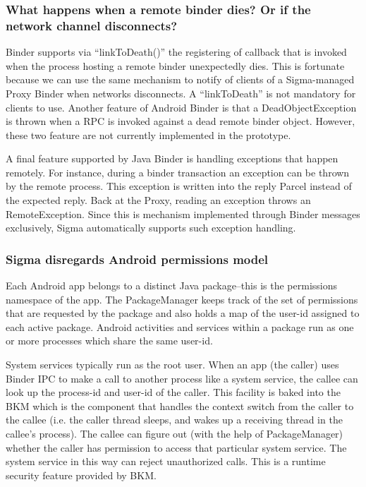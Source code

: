 \documentclass[prodmode]{acmlarge}
\begin{document}
\subsubsection{What happens when a remote binder dies? Or if the network channel disconnects?}
Binder supports via ``linkToDeath()'' the registering of callback that is invoked when the process hosting a remote binder unexpectedly dies. This is fortunate because we can use the same mechanism to notify of clients of a Sigma-managed Proxy Binder when networks disconnects. A ``linkToDeath'' is not mandatory for clients to use. Another feature of Android Binder is that a DeadObjectException is thrown when a RPC is invoked against a dead remote binder object. However, these two feature are not currently implemented in the prototype.

A final feature supported by Java Binder is handling exceptions that happen remotely. For instance, during a binder transaction an exception can be thrown by the remote process. This exception is written into the reply Parcel instead of the expected reply. Back at the Proxy, reading an exception throws an RemoteException. Since this is mechanism implemented through Binder messages exclusively, Sigma automatically supports such exception handling.

\subsubsection{Sigma disregards Android permissions model}
\label{sec:DealingWithAndroidPermissions}
Each Android app belongs to a distinct Java package--this is the permissions namespace of the app. The PackageManager keeps track of the set of permissions that are requested by the package and also holds a map of the user-id assigned to each active package. Android activities and services within a package run as one or more processes which share the same user-id.

System services typically run as the root user. When an app (the caller) uses Binder IPC to make a call to another process like a system service, the callee can look up the process-id and user-id of the caller. This facility is baked into the BKM which is the component that handles the context switch from the caller to the callee (i.e. the caller thread sleeps, and wakes up a receiving thread in the callee's process). The callee can figure out (with the help of PackageManager) whether the caller has permission to access that particular system service. The system service in this way can reject unauthorized calls. This is a runtime security feature provided by BKM.
\end{document}
